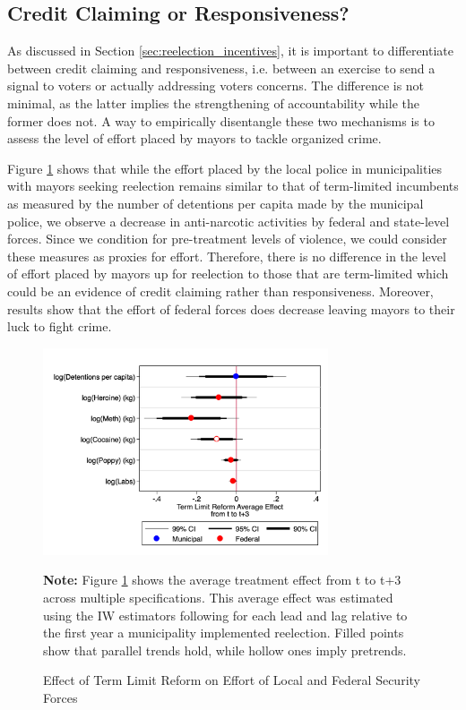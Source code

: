 \subsection{Credit Claiming or Responsiveness?}

As discussed in Section \ref{sec:reelection_incentives}, it is important to differentiate between credit claiming and responsiveness, i.e. between an exercise to send a signal to voters or actually addressing voters concerns. The difference is not minimal, as the latter implies the strengthening of accountability while the former does not. A way to empirically disentangle these two mechanisms is to assess the level of effort placed by mayors to tackle organized crime. 

Figure \ref{fig:effort} shows that while the effort placed by the local police in municipalities with mayors seeking reelection remains similar to that of term-limited incumbents as measured by the number of detentions per capita made by the municipal police, we observe a decrease in anti-narcotic activities by federal and state-level forces. Since we condition for pre-treatment levels of violence, we could consider these measures as proxies for effort. Therefore, there is no difference in the level of effort placed by mayors up for reelection to those that are term-limited which could be an evidence of credit claiming rather than responsiveness. Moreover, results show that the effort of federal forces does decrease leaving mayors to their luck to fight crime.

\begin{figure}[h]  
\centering
\caption{Effect of Term Limit Reform on Effort of Local and Federal Security Forces} 
\label{fig:effort}

   
\includegraphics[width=0.75\textwidth]{Figures/effort.png}
  
 \textbf{Note:} Figure \ref{fig:effort} shows the average treatment effect from t to t+3 across multiple specifications. This average effect was estimated using the IW estimators following \citet{abraham_sun_2020} for each lead and lag relative to the first year a municipality implemented reelection. Filled points show that parallel trends hold, while hollow ones imply pretrends.        
\end{figure} 

